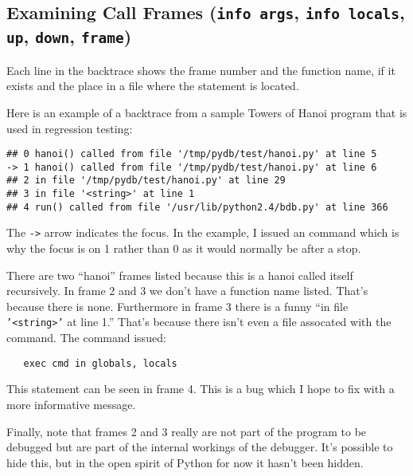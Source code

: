 \subsection{Examining Call Frames ({\tt info args}, {\tt info
    locals}, {\tt up}, {\tt down}, {\tt frame})\label{subsection-frames}}

Each line in the backtrace shows the frame number and the function
name, if it exists and the place in a file where the statement is
located.

Here is an example of a backtrace from a sample Towers of Hanoi
program that is used in regression testing:

\begin{verbatim}
## 0 hanoi() called from file '/tmp/pydb/test/hanoi.py' at line 5
-> 1 hanoi() called from file '/tmp/pydb/test/hanoi.py' at line 6
## 2 in file '/tmp/pydb/test/hanoi.py' at line 29
## 3 in file '<string>' at line 1
## 4 run() called from file '/usr/lib/python2.4/bdb.py' at line 366
\end{verbatim}

The {\tt->} arrow indicates the focus. In the example, I issued an
 command which is why the focus is on 1 rather than 0 as it
would normally be after a stop.

There are two ``hanoi'' frames listed because this is a hanoi called
itself recursively. In frame 2 and 3 we don't have a function name
listed. That's because there is none. Furthermore in frame 3 there is
a funny ``in file {\tt '<string>'} at line 1.'' That's because there
isn't even a file assocated with the command. The command issued:

\begin{verbatim}
   exec cmd in globals, locals
\end{verbatim}

This statement can be seen in frame 4. This is a bug which I hope to
fix with a more informative message.

Finally, note that frames 2 and 3 really are not part of the
program to be debugged but are part of the internal workings of the
debugger. It's possible to hide this, but in the open spirit of Python
for now it hasn't been hidden.

